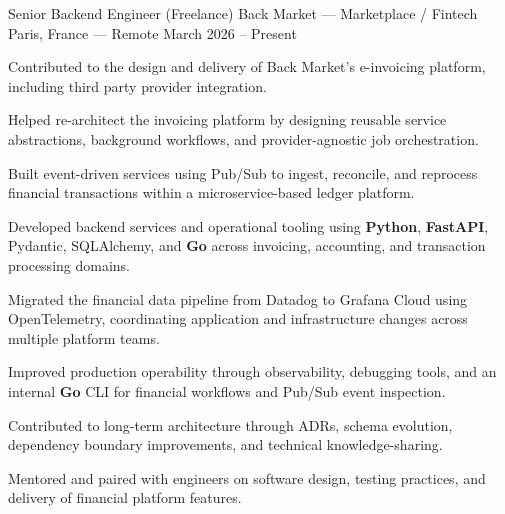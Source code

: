 

\begin{cventries}
\cventry
  {Senior Backend Engineer (Freelance)}
  {Back Market — Marketplace / Fintech}
  {Paris, France — Remote}
  {March 2026 -- Present}
  {
    \begin{cvitems}
      \item {Contributed to the design and delivery of Back Market's e-invoicing platform, including third party provider integration.}
      \item {Helped re-architect the invoicing platform by designing reusable service abstractions, background workflows, and provider-agnostic job orchestration.}
      \item {Built event-driven services using Pub/Sub to ingest, reconcile, and reprocess financial transactions within a microservice-based ledger platform.}
      \item {Developed backend services and operational tooling using \textbf{Python}, \textbf{FastAPI}, Pydantic, SQLAlchemy, and \textbf{Go} across invoicing, accounting, and transaction processing domains.}
      \item {Migrated the financial data pipeline from Datadog to Grafana Cloud using OpenTelemetry, coordinating application and infrastructure changes across multiple platform teams.}
      \item {Improved production operability through observability, debugging tools, and an internal \textbf{Go} CLI for financial workflows and Pub/Sub event inspection.}
      \item {Contributed to long-term architecture through ADRs, schema evolution, dependency boundary improvements, and technical knowledge-sharing.}
      \item {Mentored and paired with engineers on software design, testing practices, and delivery of financial platform features.}
    \end{cvitems}
  }


\end{cventries}
